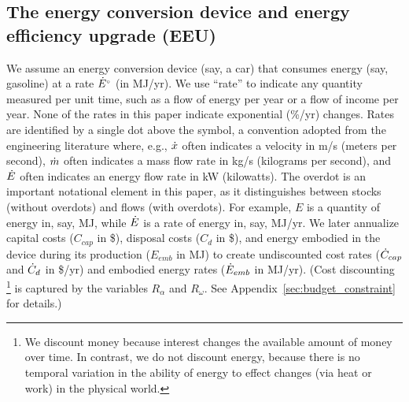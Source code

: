 \documentclass[12pt]{article}\usepackage[]{graphicx}\usepackage[]{xcolor}
\begin{document}
\subsection{The energy conversion device and energy efficiency upgrade (EEU)}
\label{sec:ecd_and_eeu}

We assume an energy conversion device (say, a car)
that consumes energy
(say, gasoline) at a rate ${}{\dot{E}}^{\scriptscriptstyle \circ}$ (in MJ/yr).
We use ``rate'' to indicate any quantity measured per unit time, 
such as a flow of energy per year or a flow of income per year.
None of the rates in this paper indicate exponential (\%/yr) changes.
Rates are identified by a single dot above the symbol,
a convention adopted from the engineering literature where, e.g.,
$\dot{x}$ often indicates a velocity in m/s (meters per second), 
$\dot{m}$ often indicates a mass flow rate in kg/s (kilograms per second), and
$\dot{E}$ often indicates an energy flow rate in kW (kilowatts).
The overdot is an important notational element in this paper, 
as it distinguishes between stocks (without overdots)
and flows (with overdots). 
For example,  
$E$ is a quantity of energy in, say, MJ, while
$\dot{E}$ is a rate of energy in, say, MJ/yr.
We later annualize capital costs ($C_{cap}$ in \$), 
disposal costs ($C_d$ in \$), and
energy embodied in the device during
its production ($E_{emb}$ in MJ) to create
undiscounted cost rates ($\dot{C}_{cap}$ and $\dot{C}_d$ in \$/yr) and
embodied energy rates ($\dot{E}_{emb}$ in MJ/yr).
(Cost discounting%
\footnote{
  We discount money because 
  interest changes the available
  amount of money over time.
  In contrast,
  we do not discount energy, 
  because there is no temporal variation
  in the ability of energy
  to effect changes 
  (via heat or work) 
  in the physical world.
}
%
is captured by the variables $R_\alpha$ and $R_\omega$.
See Appendix~\ref{sec:budget_constraint} for details.)
\end{document}
